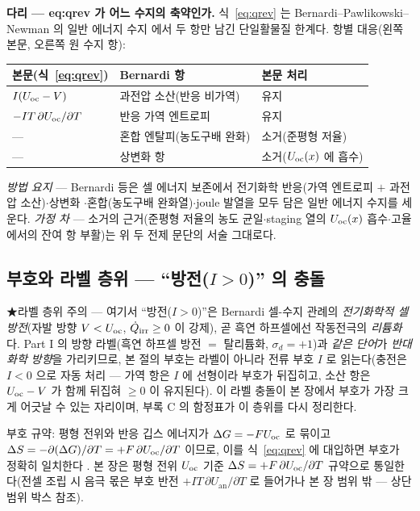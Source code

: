 \begin{srcbox}
\textbf{다리 --- eq:qrev 가 어느 수지의 축약인가.} 식~\eqref{eq:qrev} 는 Bernardi--Pawlikowski--Newman 의
일반 에너지 수지\cite{bernardi1985} 에서 두 항만 남긴 단일활물질 한계다. 항별 대응(왼쪽 본문, 오른쪽 원
수지 항):
\begin{center}\footnotesize
\begin{tabular}{@{}lll@{}}
\hline
본문(식~\eqref{eq:qrev}) & Bernardi\cite{bernardi1985} 항 & 본문 처리 \\
\hline
$I(U_{\mathrm{oc}}-V)$ & 과전압 소산(반응 비가역) & 유지 \\
$-IT\,\partial U_{\mathrm{oc}}/\partial T$ & 반응 가역 엔트로피 & 유지 \\
--- & 혼합 엔탈피(농도구배 완화) & 소거(준평형 저율) \\
--- & 상변화 항 & 소거($U_{\mathrm{oc}}(x)$ 에 흡수) \\
\hline
\end{tabular}
\end{center}
\emph{방법 요지} --- Bernardi 등은 셀 에너지 보존에서 전기화학 반응(가역 엔트로피 $+$ 과전압 소산)$\cdot$상변화
$\cdot$혼합(농도구배 완화열)$\cdot$joule 발열을 모두 담은 일반 에너지 수지를 세운다. \emph{가정 차} --- 소거의 근거(준평형 저율의 농도 균일$\cdot$staging 열의 $U_{\mathrm{oc}}(x)$ 흡수$\cdot$고율에서의 잔여 항 부활)는 위 두 전제 문단의 서술 그대로다.
\end{srcbox}

\subsection{부호와 라벨 층위 --- ``방전($I>0$)'' 의 충돌}\label{ssec:signlabel}
★라벨 층위 주의 --- 여기서 ``방전($I>0$)''은 Bernardi 셀-수지 관례의 \emph{전기화학적 셀 방전}(자발 방향
$V<U_{\mathrm{oc}}$, $\dot Q_{\mathrm{irr}}\ge0$ 이 강제), 곧 흑연 하프셀에선 작동전극의 \emph{리튬화}다. Part I 의 방향
라벨(흑연 하프셀 방전 $=$ 탈리튬화, $\sigma_d{=}+1$)과 \emph{같은 단어}가 \emph{반대 화학 방향}을 가리키므로,
본 절의 부호는 라벨이 아니라 전류 부호 $I$ 로 읽는다(충전은 $I<0$ 으로 자동 처리 --- 가역 항은 $I$ 에
선형이라 부호가 뒤집히고, 소산 항은 $U_{\mathrm{oc}}-V$ 가 함께 뒤집혀 $\ge0$ 이 유지된다). 이 라벨 충돌이 본 장에서 부호가 가장 크게 어긋날 수 있는 자리이며, 부록 C 의 함정표가 이
층위를 다시 정리한다.
\begin{srcbox}
부호 규약: 평형 전위와 반응 깁스 에너지가 $\Delta G=-FU_{\mathrm{oc}}$ 로 묶이고 $\Delta S=-\partial(\Delta
G)/\partial T=+F\,\partial U_{\mathrm{oc}}/\partial T$ 이므로, 이를 식~\eqref{eq:qrev} 에 대입하면 부호가 정확히 일치한다
\cite{newman,msmr_partI}. 본 장은 평형 전위 $U_{\mathrm{oc}}$ 기준 $\Delta S=+F\,\partial U_{\mathrm{oc}}/\partial T$ 규약으로
통일한다(전셀 조립 시 음극 몫은 부호 반전 $+IT\,\partial U_\mathrm{an}/\partial T$ 로 들어가나 본 장 범위 밖 ---
상단 범위 박스 참조).
\end{srcbox}

